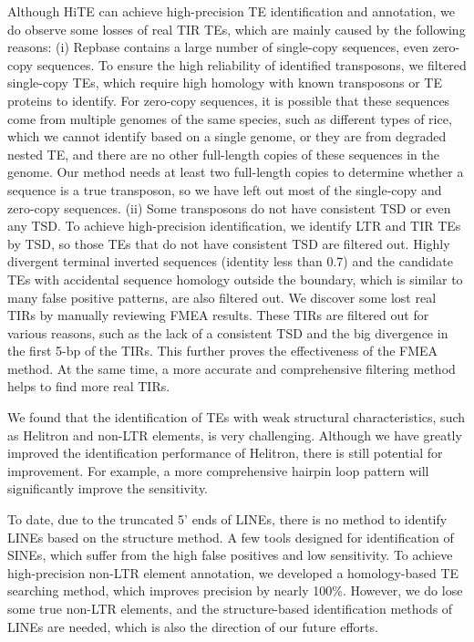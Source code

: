 \documentclass{bmcart}
\begin{document}
Although HiTE can achieve high-precision TE identification and annotation, we do observe some losses of real TIR TEs, which are mainly caused by the following reasons:
(i) Repbase contains a large number of single-copy sequences, even zero-copy sequences. To ensure the high reliability of identified transposons, we filtered single-copy TEs, which require high homology with known transposons or TE proteins to identify. For zero-copy sequences, it is possible that these sequences come from multiple genomes of the same species, such as different types of rice, which we cannot identify based on a single genome, or they are from degraded nested TE, and there are no other full-length copies of these sequences in the genome. Our method needs at least two full-length copies to determine whether a sequence is a true transposon, so we have left out most of the single-copy and zero-copy sequences.
(ii) Some transposons do not have consistent TSD or even any TSD. To achieve high-precision identification, we identify LTR and TIR TEs by TSD, so those TEs that do not have consistent TSD are filtered out. Highly divergent terminal inverted sequences (identity less than 0.7) and the candidate TEs with accidental sequence homology outside the boundary, which is similar to many false positive patterns, are also filtered out. We discover some lost real TIRs by manually reviewing FMEA results. These TIRs are filtered out for various reasons, such as the lack of a consistent TSD and the big divergence in the first 5-bp of the TIRs. This further proves the effectiveness of the FMEA method. At the same time, a more accurate and comprehensive filtering method helps to find more real TIRs.

We found that the identification of TEs with weak structural characteristics, such as Helitron and non-LTR elements, is very challenging. Although we have greatly improved the identification performance of Helitron, there is still potential for improvement. For example, a more comprehensive hairpin loop pattern will significantly improve the sensitivity.

To date, due to the truncated 5' ends of LINEs, there is no method to identify LINEs based on the structure method. A few tools designed for identification of SINEs, which suffer from the high false positives and low sensitivity. To achieve high-precision non-LTR element annotation, we developed a homology-based TE searching method, which improves precision by nearly 100\%. However, we do lose some true non-LTR elements, and the structure-based identification methods of LINEs are needed, which is also the direction of our future efforts.
\end{document}
